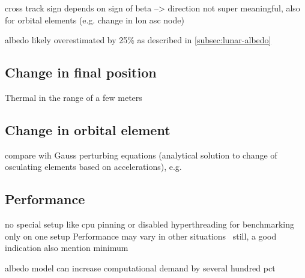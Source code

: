cross track sign depends on sign of beta --> direction not super meaningful, also for orbital elements (e.g. change in lon asc node)

albedo likely overestimated by 25\% as described in \cref{subsec:lunar-albedo}



\subsection{Change in final position}

Thermal in the range of a few meters ~\cite{Mazarico2011}


\subsection{Change in orbital element}

compare wih Gauss perturbing equations (analytical solution to change of osculating elements based on accelerations), e.g. ~\cite[Sec.~3.2]{Lucchesi2006}




\subsection{Performance}
no special setup like cpu pinning or disabled hyperthreading for benchmarking
only on one setup
Performance may vary in other situations~\cite{Mytkowicz2009}
still, a good indication
also mention minimum

albedo model can increase computational demand by several hundred pct \cite{Nicholson2010}

